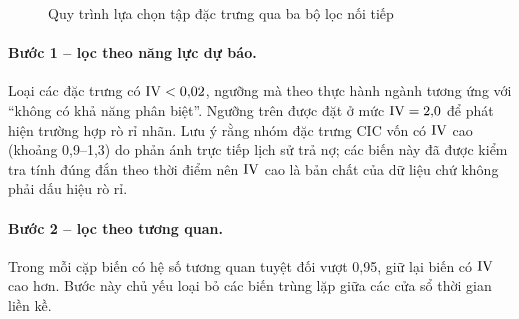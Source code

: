 \begin{figure}[htbp]
\centering
{}
\caption{Quy trình lựa chọn tập đặc trưng qua ba bộ lọc nối tiếp}
\label{fig:feature-selection}
\end{figure}

\paragraph{Bước 1 -- lọc theo năng lực dự báo.} Loại các đặc trưng có
$\mathrm{IV} < 0{,}02$, ngưỡng mà theo thực hành ngành tương ứng với ``không có khả năng
phân biệt''. Ngưỡng trên được đặt ở mức $\mathrm{IV} = 2{,}0$ để phát hiện trường hợp rò
rỉ nhãn. Lưu ý rằng nhóm đặc trưng CIC vốn có $\mathrm{IV}$ cao (khoảng 0,9--1,3) do phản
ánh trực tiếp lịch sử trả nợ; các biến này đã được kiểm tra tính đúng đắn theo
thời điểm nên $\mathrm{IV}$ cao là bản chất của dữ liệu chứ không phải dấu hiệu rò rỉ.

\paragraph{Bước 2 -- lọc theo tương quan.} Trong mỗi cặp biến có hệ số tương quan
tuyệt đối vượt 0,95, giữ lại biến có $\mathrm{IV}$ cao hơn. Bước này chủ yếu loại bỏ các
biến trùng lặp giữa các cửa sổ thời gian liền kề.

